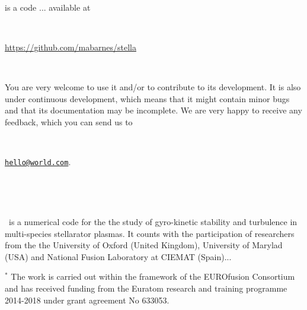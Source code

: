 

\

\

\

\

\

\

\


\normalsize
\begin{tcolorbox}[colback=gray!5,colframe=gray!40!black]

\

\stella is a code ... available at 

\

 \url{https://github.com/mabarnes/stella}

\

You are very welcome to use it and/or to contribute to its development. It is also under continuous development, which means that it might contain minor bugs and that its documentation may be incomplete. We are very happy to receive any feedback, which you can send us to 

\

\href{mailto:hello@world.com}{\nolinkurl{hello@world.com}}.

\

\

\stella~is a numerical code for the the study of gyro-kinetic stability and turbulence in multi-species stellarator plasmas. It counts with the participation of researchers from the the University of Oxford (United Kingdom), University of Marylad (USA) and National Fusion Laboratory at CIEMAT (Spain)... 
\

\footnotesize{$^*$ The work is carried out within the framework of the EUROfusion Consortium and has received funding from the Euratom research and training programme 2014-2018 under grant agreement No 633053.}

\


\end{tcolorbox}






